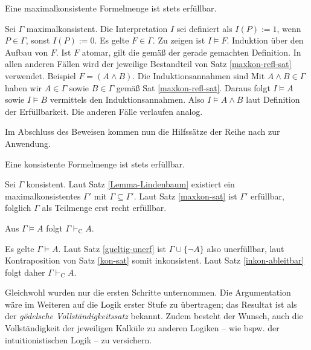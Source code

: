 \begin{Satz}\label{maxkon-sat}
Eine maximalkonsistente Formelmenge ist stets erfüllbar.
\end{Satz}
\begin{Beweis}
Sei $\Gamma$ maximalkonsistent. Die Interpretation $I$ sei definiert
als $I(P):=1$, wenn $P\in\Gamma$, sonst $I(P):=0$. Es gelte $F\in\Gamma$.
Zu zeigen ist $I\models F$. Induktion über den Aufbau von $F$. Ist $F$
atomar, gilt die gemäß der gerade gemachten Definition. In allen anderen
Fällen wird der jeweilige Bestandteil von Satz \ref{maxkon-refl-sat}
verwendet. Beispiel $F=(A\land B)$. Die Induktionsannahmen sind
Mit $A\land B\in\Gamma$ haben wir $A\in\Gamma$ sowie $B\in\Gamma$
gemäß Sat \ref{maxkon-refl-sat}. Daraus folgt $I\models A$ sowie
$I\models B$ vermittels den Induktionsannahmen. Also
$I\models A\land B$ laut Definition der Erfüllbarkeit. Die anderen
Fälle verlaufen analog.\,\qedsymbol
\end{Beweis}

Im Abschluss des Beweisen kommen nun die Hilfssätze der Reihe nach
zur Anwendung.

\begin{Satz}\label{kon-sat}
Eine konsistente Formelmenge ist stets erfüllbar.
\end{Satz}
\begin{Beweis}
Sei $\Gamma$ konsistent. Laut Satz \ref{Lemma-Lindenbaum} existiert ein
maximalkonsistentes $\Gamma'$ mit $\Gamma\subseteq\Gamma'$. Laut Satz
\ref{maxkon-sat} ist $\Gamma'$ erfüllbar, folglich $\Gamma$ als
Teilmenge erst recht erfüllbar.\,\qedsymbol
\end{Beweis}

\begin{Satz}\newlinefirst
Aus $\Gamma\models A$ folgt $\Gamma\vdash_{\mathrm C} A$.
\end{Satz}
\begin{Beweis}
Es gelte $\Gamma\models A$. Laut Satz \ref{gueltig-unerf} ist
$\Gamma\cup\{\lnot A\}$ also unerfüllbar, laut Kontraposition von Satz
\ref{kon-sat} somit inkonsistent. Laut Satz \ref{inkon-ableitbar} folgt
daher $\Gamma\vdash_{\mathrm C} A$.\,\qedsymbol
\end{Beweis}

\noindent
Gleichwohl wurden nur die ersten Schritte unternommen. Die Argumentation
wäre im Weiteren auf die Logik erster Stufe zu übertragen; das Resultat
ist als der \emph{gödelsche Vollständigkeitssatz} bekannt. Zudem besteht
der Wunsch, auch die Vollständigkeit der jeweiligen Kalküle zu anderen
Logiken -- wie bspw. der intuitionistischen Logik -- zu versichern.


